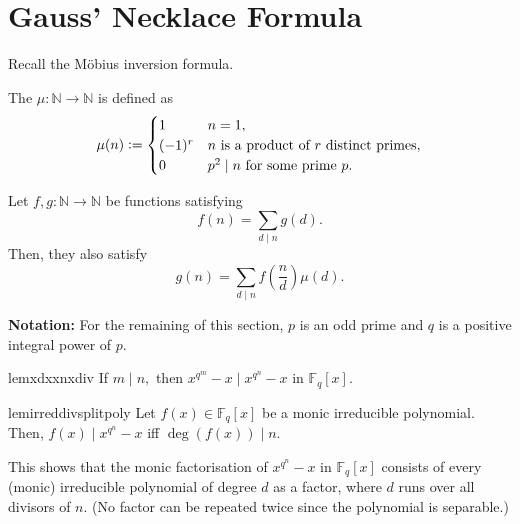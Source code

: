\section{Gauss' Necklace Formula}

Recall the M\"obius inversion formula.

\begin{defn}%
    The  $\mu : \mathbb{N} \to \mathbb{N}$ is defined as
    \begin{equation*} 
        \mu(n) \vcentcolon= \begin{cases}
            1 & n = 1,\\
            (-1)^r & n \text{ is a product of }r \text{ distinct primes},\\
            0 & p^2 \mid n \text{ for some prime }p.
        \end{cases}
    \end{equation*}
\end{defn}

\begin{thm} \label{thm:mobiusinv}
    Let $f, g : \mathbb{N} \to \mathbb{N}$ be functions satisfying
    \begin{equation*} 
        f(n) = \sum_{d \mid n} g(d).
    \end{equation*}
    Then, they also satisfy
    \begin{equation*} 
        g(n) = \sum_{d \mid n} f\left(\frac{n}{d}\right)\mu(d).
    \end{equation*}
\end{thm}

\textbf{Notation:} For the remaining of this section, $p$ is an odd prime and $q$ is a positive integral power of $p.$

\begin{restatable}[]{lem}{xdxxnxdiv}
\label{lem:xdxxnxdiv}
    If $m \mid n,$ then $x^{q^m} - x \mid x^{q^n} - x$ in $\mathbb{F}_q[x].$ \hfill\hyperref[lem:xdxxnxdiv2]{\downsym}
\end{restatable}

\begin{restatable}[]{lem}{irreddivsplitpoly}
\label{lem:irreddivsplitpoly}
    Let $f(x) \in \mathbb{F}_q[x]$ be a monic irreducible polynomial. \\
    Then, $f(x) \mid x^{q^n} - x$ iff $\deg(f(x)) \mid n.$ \hfill\hyperref[lem:irreddivsplitpoly2]{\downsym}
\end{restatable}

\begin{rem}
    This shows that the monic factorisation of $x^{q^n} - x$ in $\mathbb{F}_q[x]$ consists of every (monic) irreducible polynomial of degree $d$ as a factor, where $d$ runs over all divisors of $n.$ (No factor can be repeated twice since the polynomial is separable.)
\end{rem}

